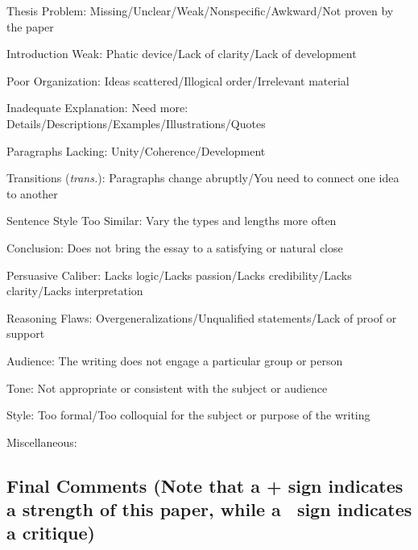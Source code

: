 \documentclass[11pt,twocolumn]{article}
\begin{document}
\begin{issues}

\item Thesis Problem: Missing/Unclear/Weak/Nonspecific/Awkward/Not proven by the paper
\item Introduction Weak: Phatic device/Lack of clarity/Lack of development
\item Poor Organization: Ideas scattered/Illogical order/Irrelevant material
\item Inadequate Explanation: Need more: Details/Descriptions/Examples/Illustrations/Quotes
\item Paragraphs Lacking: Unity/Coherence/Development
\item Transitions (\emph{trans.}): Paragraphs change abruptly/You need to connect one idea to another
\item Sentence Style Too Similar: Vary the types and lengths more often
\item Conclusion: Does not bring the essay to a satisfying or natural close
\item Persuasive Caliber: Lacks logic/Lacks passion/Lacks credibility/Lacks clarity/Lacks interpretation
\item Reasoning Flaws: Overgeneralizations/Unqualified statements/Lack of proof or support
\item Audience: The writing does not engage a particular group or person
\item Tone: Not appropriate or consistent with the subject or audience
\item Style: Too formal/Too colloquial for the subject or purpose of the writing
\item Miscellaneous:

\end{issues}

\subsection*{Final Comments (Note that a + sign indicates a strength of this paper, while a \textminus\ sign indicates a critique)}


\end{document}
